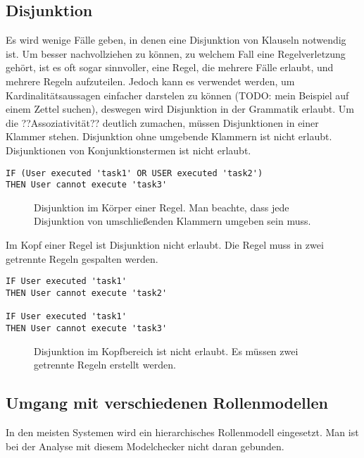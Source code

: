 \subsection{Disjunktion}
\label{sec:disjunction}
Es wird wenige Fälle geben, in denen eine Disjunktion von Klauseln notwendig ist. Um besser nachvollziehen zu können, zu welchem Fall eine Regelverletzung gehört, ist es oft sogar sinnvoller, eine Regel, die mehrere Fälle erlaubt, und mehrere Regeln aufzuteilen. Jedoch kann es verwendet werden, um Kardinalitätsaussagen einfacher darstelen zu können (TODO: mein Beispiel auf einem Zettel suchen), deswegen wird Disjunktion in der Grammatik erlaubt. Um die ??Assoziativität?? deutlich zumachen, müssen Disjunktionen in einer Klammer stehen. Disjunktion ohne umgebende Klammern ist nicht erlaubt. Disjunktionen von Konjunktionstermen ist nicht erlaubt.

\begin{verbatim}
IF (User executed 'task1' OR USER executed 'task2')
THEN User cannot execute 'task3'
\end{verbatim}
\begin{figure}[!h]
\caption{Disjunktion im Körper einer Regel. Man beachte, dass jede Disjunktion von umschließenden Klammern umgeben sein muss.}
\label{fig:disjunction1}
\end{figure}

Im Kopf einer Regel ist Disjunktion nicht erlaubt. Die Regel muss in zwei getrennte Regeln gespalten werden.

\begin{verbatim}
IF User executed 'task1'
THEN User cannot execute 'task2'

IF User executed 'task1'
THEN User cannot execute 'task3'
\end{verbatim}
\begin{figure}[!h]
\caption{Disjunktion im Kopfbereich ist nicht erlaubt. Es müssen zwei getrennte Regeln erstellt werden.}
\label{fig:disjunction2}
\end{figure}

\subsection{Umgang mit verschiedenen Rollenmodellen}
In den meisten Systemen wird ein hierarchisches Rollenmodell eingesetzt. Man ist bei der Analyse mit diesem Modelchecker nicht daran gebunden.


